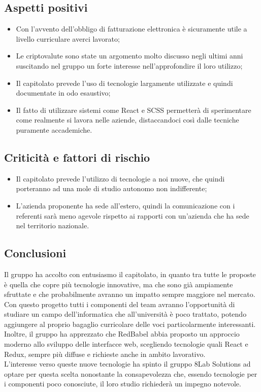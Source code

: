 \subsection{Aspetti positivi}
\begin{itemize}
	\item Con l'avvento dell'obbligo di fatturazione elettronica è sicuramente
	utile a livello curriculare averci lavorato;
	\item Le criptovalute sono state un argomento molto discusso negli ultimi anni suscitando nel gruppo un forte interesse nell'approfondire il loro utilizzo;
	\item Il capitolato prevede l'uso di tecnologie largamente utilizzate e quindi documentate in odo esaustivo;
	\item Il fatto di utilizzare sistemi come React e SCSS permetterà di
	sperimentare come realmente si lavora nelle aziende, distaccandoci così dalle
	tecniche puramente accademiche.
\end{itemize}

\subsection{Criticità e fattori di rischio}
\begin{itemize}
	\item Il capitolato prevede l'utilizzo di tecnologie a noi nuove, che quindi 
porteranno ad una mole di studio autonomo non indifferente;
	\item L'azienda proponente ha sede all'estero, quindi la comunicazione con i 
referenti sarà meno agevole rispetto ai rapporti con un'azienda che ha sede nel territorio nazionale.
\end{itemize}

\subsection{Conclusioni} Il gruppo ha accolto con entusiasmo il capitolato, in 
quanto tra tutte le proposte è quella che copre più tecnologie innovative, ma 
che sono già ampiamente sfruttate e che probabilmente avranno un impatto sempre 
maggiore nel mercato. Con questo progetto tutti i componenti del team avranno l'opportunità di studiare un 
campo dell'informatica che all'università è poco trattato, potendo aggiungere al 
proprio bagaglio curricolare delle voci particolarmente interessanti. Inoltre, il 
gruppo ha apprezzato che RedBabel abbia proposto un approccio moderno allo 
sviluppo delle interfacce web, scegliendo tecnologie quali React e Redux, sempre 
più diffuse e richieste anche in ambito lavorativo.\\
 L'interesse verso queste nuove tecnologie ha spinto il gruppo 8Lab Solutions ad 
optare per questa scelta nonostante la consapevolezza che, essendo tecnologie per i componenti
poco conosciute, il loro studio richiederà un impegno notevole.
